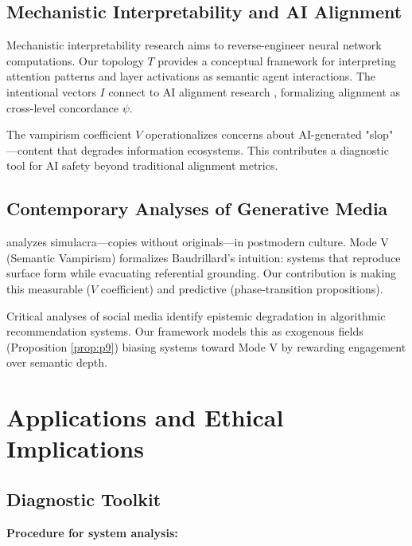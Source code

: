 \documentclass[12pt]{article}
\begin{document}
\subsection{Mechanistic Interpretability and AI Alignment}

Mechanistic interpretability research \citep{olah2020zoom, elhage2021mathematical, cammarata2020thread} aims to reverse-engineer neural network computations. Our topology $T$ provides a conceptual framework for interpreting attention patterns and layer activations as semantic agent interactions. The intentional vectors $I$ connect to AI alignment research \citep{gabriel2020artificial, christian2020alignment}, formalizing alignment as cross-level concordance $\psi$.

The vampirism coefficient $V$ operationalizes concerns about AI-generated "slop" \citep{goldstein2023generative}—content that degrades information ecosystems. This contributes a diagnostic tool for AI safety beyond traditional alignment metrics.

\subsection{Contemporary Analyses of Generative Media}

\citet{baudrillard1981simulacra} analyzes simulacra—copies without originals—in postmodern culture. Mode V (Semantic Vampirism) formalizes Baudrillard's intuition: systems that reproduce surface form while evacuating referential grounding. Our contribution is making this measurable ($V$ coefficient) and predictive (phase-transition propositions).

Critical analyses of social media \citep{lanier2018ten, zuboff2019surveillance} identify epistemic degradation in algorithmic recommendation systems. Our framework models this as exogenous fields (Proposition \ref{prop:p9}) biasing systems toward Mode V by rewarding engagement over semantic depth.

\section{Applications and Ethical Implications}
\label{sec:applications}

\subsection{Diagnostic Toolkit}

\textbf{Procedure for system analysis:}
\end{document}
